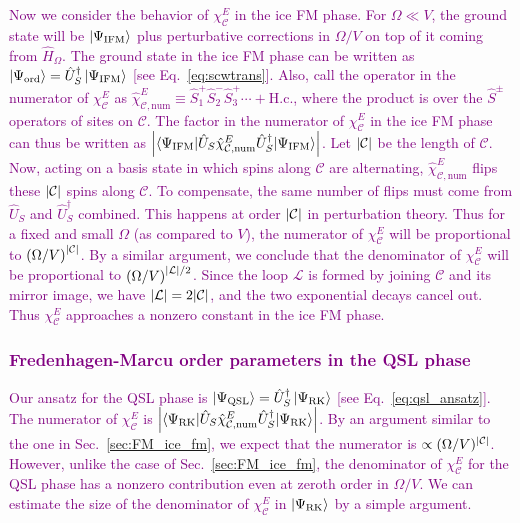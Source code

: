 \documentclass[twocolumn,superscriptaddress,amsmath,amssymb,aps,prx,nofootinbib]{revtex4-2}
\newcommand{\newtext}[1]{\textcolor{purple}{#1}}
\begin{document}
\newtext{Now we consider the behavior of $\chi_{\mathcal{C}}^E$ in the ice FM phase. 
For $\Omega \ll V$, the ground state will be $\ket{\Psi_\text{IFM}}$ plus perturbative corrections in $\Omega/V$ on top of it coming from $\hat{H}_\Omega$. 
The ground state in the ice FM phase can be written as $\ket{\Psi_{\text{ord}}} = \hat{U}_S^\dagger \ket{\Psi_{\text{IFM}} }$ [see Eq.~\eqref{eq:scwtrans}]. 
Also, call the operator in the numerator of $\chi_{\mathcal{C}}^E$ as $\hat{\chi}_{\mathcal{C}, \text{num}}^E \equiv \hat{S}_1^+ \hat{S}_2^- \hat{S}_3^+\cdots + \text{H.c.}$, where the product is over the $\hat{S}^\pm$ operators of sites on $\mathcal{C}$.
The factor in the numerator of $\chi_\mathcal{C}^E$ in the ice FM phase can thus be written as $\abs{\langle \Psi_{\text{IFM}} | \hat{U}_S \hat{\chi}_{\mathcal{C}, \text{num}}^E \hat{U}_S^\dagger | \Psi_{\text{IFM}} \rangle} $. Let $\abs{\mathcal{C}}$ be the length of $\mathcal{C}$. Now, acting on a basis state in which spins along $\mathcal{C}$ are alternating, $\hat{\chi}_{\mathcal{C}, \text{num}}^E$ flips these $\abs{\mathcal{C}}$ spins along $\mathcal{C}$.
To compensate, the same number of flips must come from $\hat{U}_S$ and $\hat{U}_S^\dagger$ combined. 
This happens at order $\abs{\mathcal{C}}$ in perturbation theory.
Thus for a fixed and small $\Omega$ (as compared to $V$), the numerator of $\chi_\mathcal{C}^E$ will be proportional to $\left( \Omega/V \right) ^ {\abs{\mathcal{C}}  }$.
By a similar argument, we conclude that the denominator of $\chi_\mathcal{C}^E$ will be proportional to $\left( \Omega / V \right) ^ {\abs{\mathcal{L}} /2 }$.
Since the loop $\mathcal{L}$ is formed by joining $\mathcal{C}$ and its mirror image, we have $\abs{\mathcal{L}} = 2\abs{\mathcal{C}}$, and the two exponential decays cancel out. 
Thus $\chi_{\mathcal{C}}^E$ approaches a nonzero constant in the ice FM phase.
}

\newtext{\subsubsection{Fredenhagen-Marcu order parameters in the QSL phase}} \label{sec:FM_qsl}

\newtext{Our ansatz for the QSL phase is $\ket{\Psi_{\text{QSL}}} = \hat{U}_{S}^\dagger \ket{\Psi_{\text{RK}}}$ [see Eq.~\eqref{eq:qsl_ansatz}]. 
The numerator of $\chi_{\mathcal{C}}^E$ is $\abs{\langle \Psi_{\text{RK}} | \hat{U}_S \hat{\chi}_{\mathcal{C}, \text{num}}^E \hat{U}_S^\dagger | \Psi_{\text{RK}} \rangle} $.
By an argument similar to the one in  Sec.~\ref{sec:FM_ice_fm}, we expect that the numerator is $\propto (\Omega/V)^{\abs{\mathcal{C}}}$.
However, unlike the case of Sec.~\ref{sec:FM_ice_fm}, the denominator of $\chi_\mathcal{C}^E$ for the QSL phase has a nonzero contribution even at zeroth order in $\Omega/V$. 
We can estimate the size of the denominator of $\chi_{\mathcal{C}}^E$ in $\ket{\Psi_{\text{RK}}}$ by a simple argument.}
\end{document}
